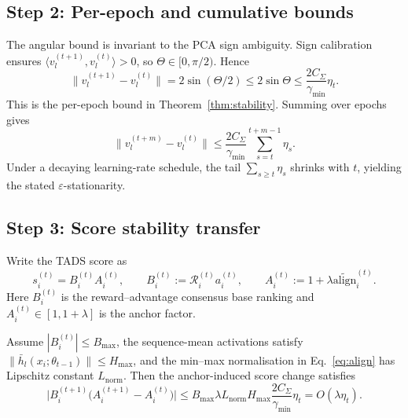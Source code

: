 \subsection{Step 2: Per-epoch and cumulative bounds}
\label{app:step-euclidean}

The angular bound is invariant to the PCA sign ambiguity. Sign
calibration ensures
$\langle v_l^{(t+1)},v_l^{(t)}\rangle>0$, so
$\Theta\in[0,\pi/2)$. Hence
\begin{equation}
  \bigl\|v_l^{(t+1)}-v_l^{(t)}\bigr\|
  =
  2\sin(\Theta/2)
  \le
  2\sin\Theta
  \le
  \frac{2C_\Sigma}{\gamma_{\min}}\eta_t .
  \label{eq:perepoch-bound}
\end{equation}
This is the per-epoch bound in Theorem~\ref{thm:stability}. Summing
over epochs gives
\begin{equation}
  \bigl\|v_l^{(t+m)}-v_l^{(t)}\bigr\|
  \le
  \frac{2C_\Sigma}{\gamma_{\min}}
  \sum_{s=t}^{t+m-1}\eta_s .
  \label{eq:cumulative-bound-app}
\end{equation}
Under a decaying learning-rate schedule, the tail
$\sum_{s\ge t}\eta_s$ shrinks with $t$, yielding the stated
$\varepsilon$-stationarity.

\subsection{Step 3: Score stability transfer}
\label{app:score-stability}

Write the \textsc{TADS} score as
\[
s_i^{(t)} = B_i^{(t)}A_i^{(t)},
\qquad
B_i^{(t)} := \mathcal{R}_i^{(t)}a_i^{(t)},
\qquad
A_i^{(t)} := 1+\lambda\widetilde{\mathrm{align}}_i^{(t)} .
\]
Here $B_i^{(t)}$ is the reward--advantage consensus base ranking and
$A_i^{(t)}\in[1,1+\lambda]$ is the anchor factor.

\begin{corollary}
\label{cor:score-stability}
Assume $|B_i^{(t)}|\le B_{\max}$, the sequence-mean activations
satisfy $\|\bar h_l(x_i;\theta_{t-1})\|\le H_{\max}$, and the
min--max normalisation in Eq.~\ref{eq:align} has Lipschitz constant
$L_{\mathrm{norm}}$. Then the anchor-induced score change satisfies
\begin{equation}
  \bigl|
  B_i^{(t+1)}
  \bigl(A_i^{(t+1)}-A_i^{(t)}\bigr)
  \bigr|
  \le
  B_{\max}\lambda L_{\mathrm{norm}}H_{\max}
  \frac{2C_\Sigma}{\gamma_{\min}}\eta_t
  =
  O(\lambda\eta_t).
  \label{eq:cor-score-bound}
\end{equation}
\end{corollary}

